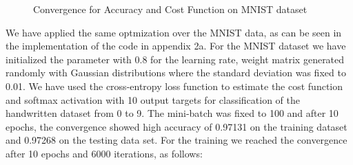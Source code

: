 \documentclass{article}
\begin{document}
\begin{figure}[H]
  \centering
  \hfill
  \caption{Convergence for Accuracy and Cost Function on MNIST dataset}
\end{figure}


We have applied the same optmization over the MNIST data, as can be seen in the implementation of the code in appendix 2a. For the MNIST dataset we have initialized the parameter with 0.8 for the learning rate, weight matrix generated randomly with Gaussian distributions where the standard deviation was fixed to 0.01. We have used the cross-entropy loss function to estimate the cost function and softmax activation with 10 output targets for classification of the handwritten dataset from 0 to 9. The mini-batch was fixed to 100 and after 10 epochs, the convergence showed high accuracy of 0.97131 on the training dataset and 0.97268 on the testing data set. For the training we reached the convergence after 10 epochs and 6000 iterations, as follows:
\end{document}
